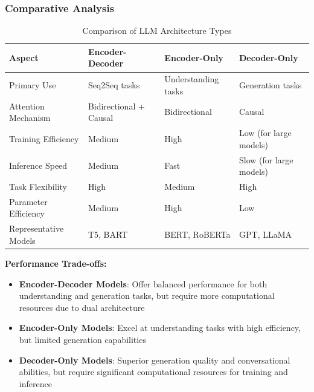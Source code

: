 \documentclass[12pt,a4paper]{article}
\begin{document}
\subsubsection{Comparative Analysis}


\begin{table}[H]
\centering
\caption{Comparison of LLM Architecture Types}
\label{tab:llm_comparison}
\begin{tabular}{|l|l|l|l|}
\hline
\textbf{Aspect} & \textbf{Encoder-Decoder} & \textbf{Encoder-Only} & \textbf{Decoder-Only} \\
\hline
Primary Use & Seq2Seq tasks & Understanding tasks & Generation tasks \\
\hline
Attention Mechanism & Bidirectional + Causal & Bidirectional & Causal \\
\hline
Training Efficiency & Medium & High & Low (for large models) \\
\hline
Inference Speed & Medium & Fast & Slow (for large models) \\
\hline
Task Flexibility & High & Medium & High \\
\hline
Parameter Efficiency & Medium & High & Low \\
\hline
Representative Models & T5, BART & BERT, RoBERTa & GPT, LLaMA \\
\hline
\end{tabular}
\end{table}

\textbf{Performance Trade-offs:}

\begin{itemize}
    \item \textbf{Encoder-Decoder Models}: Offer balanced performance for both understanding and generation tasks, but require more computational resources due to dual architecture
    \item \textbf{Encoder-Only Models}: Excel at understanding tasks with high efficiency, but limited generation capabilities
    \item \textbf{Decoder-Only Models}: Superior generation quality and conversational abilities, but require significant computational resources for training and inference
\end{itemize}
\end{document}
